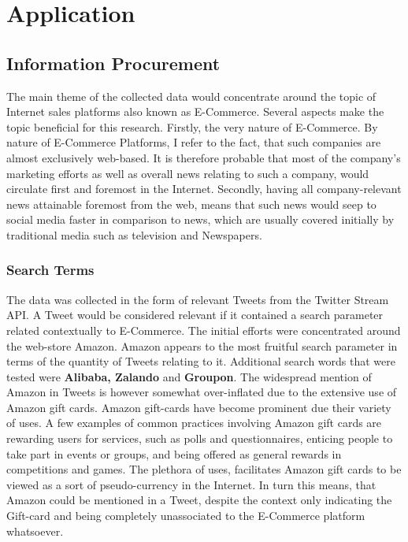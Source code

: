 \section{Application}
\label{Application}
	\subsection{Information Procurement}
	The main theme of the collected data would concentrate around the topic of Internet sales platforms also known as E-Commerce. Several aspects make the topic beneficial for this research. Firstly, the very nature of E-Commerce. By nature of E-Commerce Platforms, I refer to the fact, that such companies are almost exclusively web-based. It is therefore probable that most of the company's marketing efforts as well as overall news relating to such a company, would circulate first and foremost in the Internet. Secondly, having all company-relevant news attainable foremost from the web, means that such news would seep to social media faster in comparison to news, which are usually covered initially by traditional media such as television and Newspapers. 
	
		\subsubsection*{Search Terms}
		The data was collected in the form of relevant Tweets from the Twitter Stream API. A Tweet would be considered relevant if it contained a search parameter related contextually to E-Commerce. The initial efforts were concentrated around the web-store Amazon. Amazon appears to the most fruitful search parameter in terms of the quantity of Tweets relating to it. Additional search words that were tested were {\bfseries Alibaba, Zalando} and {\bfseries Groupon}. 
		The widespread mention of Amazon in Tweets is however somewhat over-inflated due to the extensive use of Amazon gift cards. Amazon gift-cards have become prominent due their variety of uses. A few examples of common practices involving Amazon gift cards are rewarding users for services, such as polls and questionnaires, enticing people to take part in events or groups, and being offered as general rewards in competitions and games. The plethora of uses, facilitates Amazon gift cards to be viewed as a sort of pseudo-currency in the Internet. In turn this means, that Amazon could be mentioned in a Tweet, despite the context only indicating the Gift-card and being completely unassociated to the E-Commerce platform whatsoever.
		
